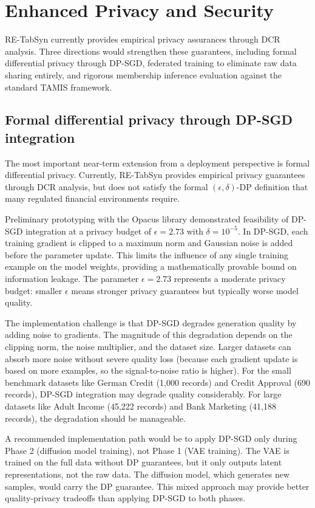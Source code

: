 \section{Enhanced Privacy and Security}

RE-TabSyn currently provides empirical privacy assurances through DCR analysis. Three directions would strengthen these guarantees, including formal differential privacy through DP-SGD, federated training to eliminate raw data sharing entirely, and rigorous membership inference evaluation against the standard TAMIS framework.

\subsection{Formal differential privacy through DP-SGD integration}

The most important near-term extension from a deployment perspective is formal differential privacy. Currently, RE-TabSyn provides empirical privacy guarantees through DCR analysis, but does not satisfy the formal $(\epsilon, \delta)$-DP definition that many regulated financial environments require.

Preliminary prototyping with the Opacus library \cite{yousefpour2021opacus} demonstrated feasibility of DP-SGD integration at a privacy budget of $\epsilon = 2.73$ with $\delta = 10^{-5}$. In DP-SGD, each training gradient is clipped to a maximum norm and Gaussian noise is added before the parameter update. This limits the influence of any single training example on the model weights, providing a mathematically provable bound on information leakage. The parameter $\epsilon = 2.73$ represents a moderate privacy budget: smaller $\epsilon$ means stronger privacy guarantees but typically worse model quality.

The implementation challenge is that DP-SGD degrades generation quality by adding noise to gradients. The magnitude of this degradation depends on the clipping norm, the noise multiplier, and the dataset size. Larger datasets can absorb more noise without severe quality loss (because each gradient update is based on more examples, so the signal-to-noise ratio is higher). For the small benchmark datasets like German Credit (1,000 records) and Credit Approval (690 records), DP-SGD integration may degrade quality considerably. For large datasets like Adult Income (45,222 records) and Bank Marketing (41,188 records), the degradation should be manageable.

A recommended implementation path would be to apply DP-SGD only during Phase 2 (diffusion model training), not Phase 1 (VAE training). The VAE is trained on the full data without DP guarantees, but it only outputs latent representations, not the raw data. The diffusion model, which generates new samples, would carry the DP guarantee. This mixed approach may provide better quality-privacy tradeoffs than applying DP-SGD to both phases.

